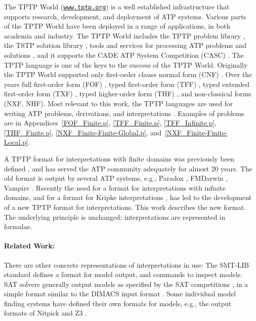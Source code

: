 \documentclass{easychair}
\begin{document}
The TPTP World \cite{Sut17} (\href{https://www.tptp.org}{\tt www.tptp.org}) is a well established 
infrastructure that supports research, development, and deployment of 
ATP systems.
Various parts of the TPTP World have been deployed in a range of applications, in both academia 
and industry.
The TPTP World includes the TPTP problem library \cite{Sut09}, 
the TSTP solution library \cite{Sut10}, 
tools and services for processing ATP problems and solutions \cite{Sut10}, 
and it supports the CADE ATP System Competition (CASC) \cite{Sut16}.
The TPTP language \cite{Sut23-IGPL} is one of the keys to the success of the TPTP World.
Originally the TPTP World supported only first-order clause normal form (CNF)
\cite{SS98-JAR}.
Over the years full first-order form (FOF)
\cite{Sut09}, 
typed first-order form (TFF)
\cite{SS+12,BP13-TFF1}, 
typed extended first-order form (TXF)
\cite{SK18}, 
typed higher-order form (THF)
\cite{SB10,KSR16}, 
and non-classical forms (NXF, NHF).
Most relevant to this work, the TPTP languages are used for writing ATP problems, 
derivations, and interpretations \cite{SS+06,Sut08-KEAPPA}.
Examples of problems are in Appendices~\ref{FOF_Finite.p}, \ref{TFF_Finite.p},
\ref{TFF_Infinite.p}, \ref{THF_Finite.p}, \ref{NXF_Finite-Finite-Global.p}, 
and~\ref{NXF_Finite-Finite-Local.p}.

A TPTP format for interpretations with finite domains was previously been defined \cite{SS+06},
and has served the ATP community adequately for almost 20 years. 
The old format is output by several ATP systems, e.g., Paradox \cite{CS03}, FMDarwin \cite{BF+06}, 
Vampire \cite{KV13}.
Recently the need for a format for interpretations with infinite domains, and for a format for 
Kripke interpretations \cite{Kri63}, has led to the development of a new TPTP format for 
interpretations.
This work describes the new format.
The underlying principle is unchanged: interpretations are represented in formulae.

\paragraph{Related Work:}
There are other concrete representations of interpretations in use:
The SMT-LIB standard \cite{BFT17} defines a format for model output, and commands to inspect 
models.  
SAT solvers generally output models as specified by the SAT competitions \cite{JL+12}, in a 
simple format similar to the DIMACS input format \cite{Bab93}.
Some individual model finding systems have defined their own formats for models, e.g., the 
output formats of Nitpick \cite{BN10-ITP} and Z3 \cite{dMB08}.
\end{document}
